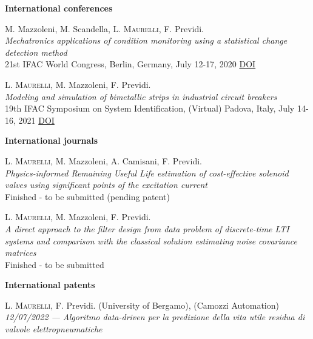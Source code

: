 \documentclass[10pt]{article}
\begin{document}
\textbf{International conferences}
\begin{enumerate}[label={[C0{\arabic*}]}]
	\setlength\itemsep{-3pt}
	\item \label{c2020}M. Mazzoleni, M. Scandella, \textsc{L. Maurelli}, F. Previdi.\\
	\textit{Mechatronics applications of condition monitoring using a statistical change detection method}\\
	21st IFAC World Congress, Berlin, Germany, July 12-17, 2020 \hfill \href{https://doi.org/10.1016/j.ifacol.2020.12.100}{DOI}
	\item \label{c2021}\textsc{L. Maurelli}, M. Mazzoleni, F. Previdi.\\
	\textit{Modeling and simulation of bimetallic strips in industrial circuit breakers}\\
	19th IFAC Symposium on System Identification, (Virtual) Padova, Italy, July 14-16, 2021 \hfill \href{https://doi.org/10.1016/j.ifacol.2021.08.460}{DOI}
\end{enumerate}

\textbf{International journals}
\begin{enumerate}[label={[J0{\arabic*}]}]
	\setlength\itemsep{-3pt}
	\item \label{j2022}\textsc{L. Maurelli}, M. Mazzoleni, A. Camisani, F. Previdi.\\
	\textit{Physics-informed Remaining Useful Life estimation of cost-effective solenoid
	valves using significant points of the excitation current}\\
	Finished - to be submitted (pending patent)
	\item \label{j02}\textsc{L. Maurelli}, M. Mazzoleni, F. Previdi.\\
	\textit{A direct approach to the filter design from data problem of
	discrete-time LTI systems and comparison with the classical
	solution estimating noise covariance matrices}\\
	Finished - to be submitted
\end{enumerate}

\textbf{International patents}
\begin{enumerate}[label={[P0{\arabic*}]}]
	\setlength\itemsep{-3pt}
	\item \label{p2022}\textsc{L. Maurelli}, F. Previdi. (University of Bergamo), (Camozzi Automation)\\
	\textit{12/07/2022 --- Algoritmo data-driven per la predizione della vita utile
	residua di valvole elettropneumatiche}\\
\end{enumerate}
\clearpage
\end{document}
